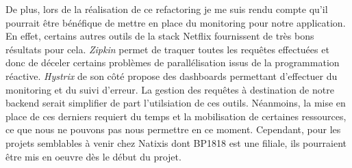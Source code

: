 	De plus, lors de la réalisation de ce refactoring je me suis rendu compte qu'il pourrait être bénéfique de mettre en place du monitoring pour notre application. En effet, certains autres outils de la stack Netflix fournissent de très bons résultats pour cela. \textit{Zipkin} permet de traquer toutes les requêtes effectuées et donc de déceler certains problèmes de parallélisation issus de la programmation réactive. \textit{Hystrix} de son côté propose des dashboards permettant d'effectuer du monitoring et du suivi d'erreur. La gestion des requêtes à destination de notre backend serait simplifier de part l'utilsiation de ces outils. Néanmoins, la mise en place de ces derniers requiert du temps et la mobilisation de certaines ressources, ce que nous ne pouvons pas nous permettre en ce moment. Cependant, pour les projets semblables à venir chez Natixis dont BP1818 est une filiale, ils pourraient être mis en oeuvre dès le début du projet.